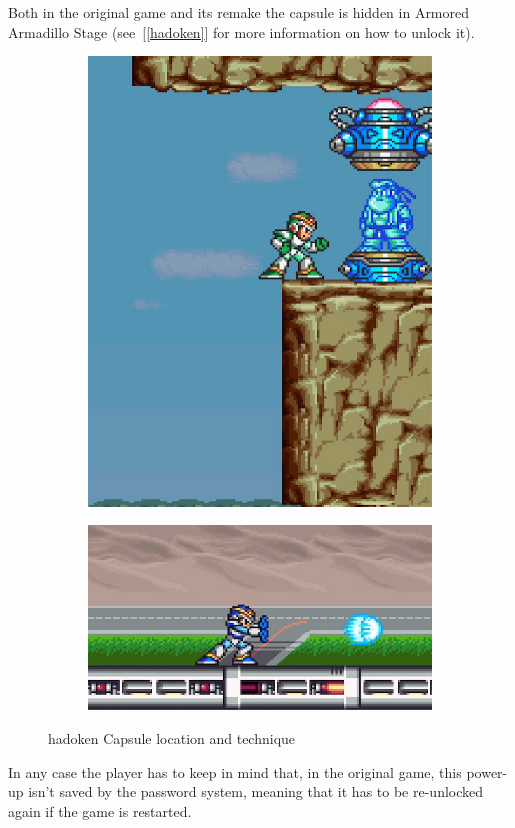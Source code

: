 \begin{itemize}
	Both in the original game and its remake the capsule is hidden in Armored Armadillo Stage (see~[\ref{hadoken}] for more information on how to unlock it).
	\begin{figure}[htp]
		\centering
		\begin{subfigure}{0.3\linewidth}
			\centering
			\includegraphics[width=\textwidth]{figures/X1/Armored_armadillo/Armadillo_hadoken.jpg}
		\end{subfigure}
		\begin{subfigure}{0.5\linewidth}
			\centering
			\includegraphics[width=\textwidth]{figures/X1/weapons/hadoken.jpg}
		\end{subfigure}
		\caption{hadoken Capsule location and technique}
	\end{figure}
	In any case the player has to keep in mind that, in the original game, this power-up isn't saved by the password system, meaning that it has to be re-unlocked again if the game is restarted.
\end{itemize}

